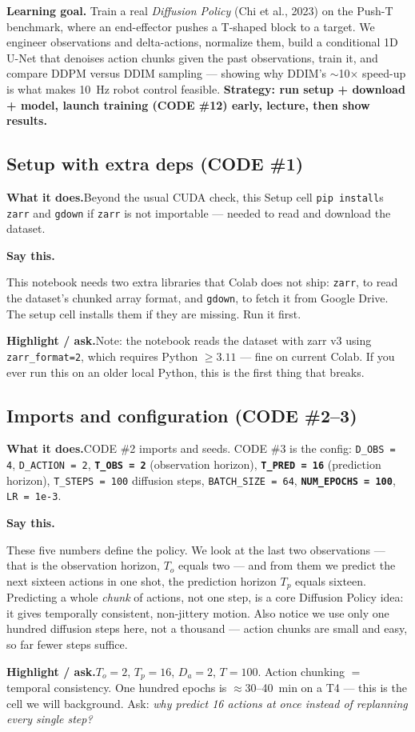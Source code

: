 \documentclass[11pt]{article}
\newenvironment{saythis}{%
  \par\smallskip\noindent
  \begin{list}{}{%
    \setlength{\leftmargin}{1.2em}%
    \setlength{\rightmargin}{0.5em}%
    \setlength{\topsep}{2pt}%
  }\item\relax
  \color{sayrule}\textbf{Say this.}\hspace{0.4em}\color{black}\itshape
}{%
  \end{list}\par\smallskip
}
\newcommand{\highlight}[1]{\par\smallskip\noindent\textcolor{hlcolor}{\textbf{Highlight / ask.}}\hspace{0.4em}#1\par\smallskip}
\newcommand{\whatdoes}[1]{\par\noindent\textbf{What it does.}\hspace{0.4em}#1\par}
\begin{document}
\textbf{Learning goal.} Train a real \emph{Diffusion Policy} (Chi et al., 2023) on the Push-T
benchmark, where an end-effector pushes a T-shaped block to a target. We engineer observations and
delta-actions, normalize them, build a conditional 1D U-Net that denoises action chunks given the past
observations, train it, and compare DDPM versus DDIM sampling --- showing why DDIM's $\sim$10$\times$
speed-up is what makes 10~Hz robot control feasible. \textbf{Strategy: run setup + download + model,
launch training (CODE \#12) early, lecture, then show results.}

\subsection{Setup with extra deps (CODE \#1)}
\whatdoes{Beyond the usual CUDA check, this Setup cell \texttt{pip install}s \texttt{zarr} and
\texttt{gdown} if \texttt{zarr} is not importable --- needed to read and download the dataset.}
\begin{saythis}
This notebook needs two extra libraries that Colab does not ship: \texttt{zarr}, to read the dataset's
chunked array format, and \texttt{gdown}, to fetch it from Google Drive. The setup cell installs them
if they are missing. Run it first.
\end{saythis}
\highlight{Note: the notebook reads the dataset with zarr v3 using \texttt{zarr\_format=2}, which
requires Python $\ge 3.11$ --- fine on current Colab. If you ever run this on an older local Python, this
is the first thing that breaks.}

\subsection{Imports and configuration (CODE \#2--3)}
\whatdoes{CODE \#2 imports and seeds. CODE \#3 is the config: \texttt{D\_OBS = 4}, \texttt{D\_ACTION = 2},
\textbf{\texttt{T\_OBS = 2}} (observation horizon), \textbf{\texttt{T\_PRED = 16}} (prediction horizon),
\texttt{T\_STEPS = 100} diffusion steps, \texttt{BATCH\_SIZE = 64}, \textbf{\texttt{NUM\_EPOCHS = 100}},
\texttt{LR = 1e-3}.}
\begin{saythis}
These five numbers define the policy. We look at the last two observations --- that is the observation
horizon, $T_o$ equals two --- and from them we predict the next sixteen actions in one shot, the
prediction horizon $T_p$ equals sixteen. Predicting a whole \emph{chunk} of actions, not one step, is a
core Diffusion Policy idea: it gives temporally consistent, non-jittery motion. Also notice we use only
one hundred diffusion steps here, not a thousand --- action chunks are small and easy, so far fewer
steps suffice.
\end{saythis}
\highlight{$T_o=2$, $T_p=16$, $D_a=2$, $T=100$. Action chunking $=$ temporal consistency. One hundred
epochs is $\approx$30--40~min on a T4 --- this is the cell we will background. Ask: \emph{why predict 16
actions at once instead of replanning every single step?}}
\end{document}
